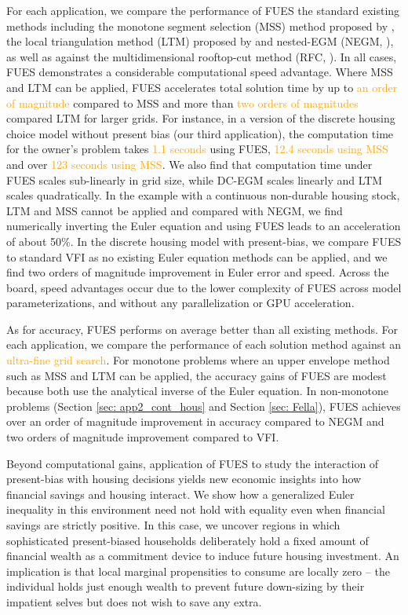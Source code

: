 \documentclass[12pt]{article}
\begin{document}
For each application, we compare the performance of FUES the standard existing methods including the monotone segment selection (MSS) method proposed by \citep{Iskhakov2017}, the local triangulation method (LTM) proposed by \cite{Druedahl2021} and nested-EGM (NEGM, \cite{Druedahl2021}), as well as against the multidimensional rooftop-cut method (RFC, \cite{DS2024RFC}). In all cases, FUES demonstrates a considerable computational speed advantage. Where MSS and LTM can be applied, FUES accelerates total solution time by up to \textcolor{orange}{an order of magnitude} compared to MSS and more than \textcolor{orange}{two orders of magnitudes} compared LTM for larger grids. For instance, in a version of the discrete housing choice model without present bias (our third application), the computation time for the owner's problem takes \textcolor{orange}{1.1 seconds} using FUES, \textcolor{orange}{12.4 seconds using MSS} and over \textcolor{orange}{123 seconds using MSS}. We also find that computation time under FUES scales sub-linearly in grid size, while DC-EGM scales linearly and LTM scales quadratically. In the example with a continuous non-durable housing stock, LTM and MSS cannot be applied and compared with NEGM, we find numerically inverting the Euler equation and using FUES leads to an acceleration of about 50\%. In the discrete housing model with present-bias, we compare FUES to standard VFI as no existing Euler equation methods can be applied, and we find two orders of magnitude improvement in Euler error and speed. Across the board, speed advantages occur due to the lower complexity of FUES across model parameterizations, and without any parallelization or GPU acceleration. 

As for accuracy, FUES performs on average better than all existing methods. For each application, we compare the performance of each solution method against an \textcolor{orange}{ultra-fine grid search}. For monotone problems where an upper envelope method such as MSS and LTM can be applied, the accuracy gains of FUES are modest because both use the analytical inverse of the Euler equation. In non-monotone problems (Section \ref{sec: app2_cont_hous} and Section \ref{sec: Fella}),  FUES achieves over an order of magnitude improvement in accuracy compared to NEGM and two orders of magnitude improvement compared to VFI. 

Beyond computational gains, application of FUES to study the interaction of present-bias with housing decisions yields new economic insights into how financial savings and housing interact.  We show how a generalized Euler inequality in this environment need not hold with equality even when financial savings are strictly positive. In this case, we uncover regions in which sophisticated present-biased households deliberately hold a fixed amount of financial wealth as a commitment device to induce future housing investment. An implication is that local marginal propensities to consume are locally zero -- the individual holds just enough wealth to prevent future down-sizing by their impatient selves but does not wish to save any extra. 
\end{document}
